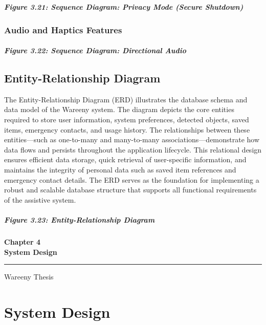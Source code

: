\documentclass[12pt,a4paper]{report}
\newcommand{\chaptercover}[1]{%
  \clearpage
  \thispagestyle{empty}
  \vspace*{\fill}
  \begin{center}
    {\Huge\bfseries #1\par}
    \vspace{0.8cm}
    \rule{0.35\textwidth}{1pt}\par
    \vspace{0.6cm}
    {\Large Wareeny Thesis\par}
  \end{center}
  \vspace*{\fill}
  \clearpage
}
\begin{document}
\paragraph*{Figure 3.21: Sequence Diagram: Privacy Mode (Secure Shutdown)}

\subsection{Audio and Haptics Features}

\paragraph*{Figure 3.22: Sequence Diagram: Directional Audio}

\section{Entity-Relationship Diagram}

The Entity-Relationship Diagram (ERD) illustrates the database schema and data model of the Wareeny system. The diagram depicts the core entities required to store user information, system preferences, detected objects, saved items, emergency contacts, and usage history. The relationships between these entities---such as one-to-many and many-to-many associations---demonstrate how data flows and persists throughout the application lifecycle. This relational design ensures efficient data storage, quick retrieval of user-specific information, and maintains the integrity of personal data such as saved item references and emergency contact details. The ERD serves as the foundation for implementing a robust and scalable database structure that supports all functional requirements of the assistive system.

\paragraph*{Figure 3.23: Entity-Relationship Diagram}



\chaptercover{Chapter 4\\System Design}
\chapter{System Design}
\end{document}
